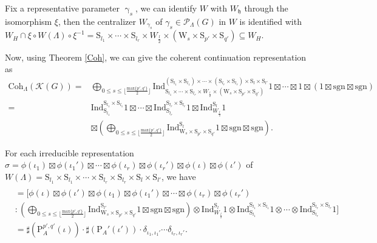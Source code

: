 \documentclass[12pt, a4paper]{amsart}
\numberwithin{equation}{section}
\newcommand{\CK}{{\mathcal {K}}}
\newcommand{\CP}{{\mathcal {P}}}
\newcommand{\fh}{\mathfrak{h}}
\newcommand{\Ind}{{\mathrm{Ind}}}
\newcommand{\sgn}{{\mathrm{sgn}}}
\begin{document}
Fix a representative parameter $\upgamma_s$, we can identify $W$ with $W_{\fh}$ through the isomorphism $\xi$, then the centralizer $W_{{\gamma_{s}}}$ of ${\gamma_{s}} \in \CP_{\Lambda}(G)$ in $W$ is identified with $W_{H} \cap \xi \circ W(\Lambda) \circ \xi^{-1} = \mathrm{S}_{l_1} \times \cdots \times \mathrm{S}_{l_r} \times W_{\frac{l}{2}} \times (\mathrm{W}_{s} \times \mathrm{S}_{p'} \times \mathrm{S}_{q'}) \subseteq W_{H}$.

Now, using Theorem \ref{Coh}, we can give the coherent continuation representation as
\begin{align*}
    \mathrm{Coh}_{\Lambda}(\CK(G))  = &\bigoplus_{0 \leq s \leq \lfloor\frac{\mathrm{max}\{p',q'\}}{2}\rfloor} \Ind _{\mathrm{S}_{l_1} \times \cdots \times \mathrm{S}_{l_r} \times W_{\frac{l}{2}} \times (\mathrm{W}_{s} \times \mathrm{S}_{p'} \times \mathrm{S}_{q'})}^{(\mathrm{S}_{l_1} \times \mathrm{S}_{l_1}) \times \cdots \times (\mathrm{S}_{l_r} \times \mathrm{S}_{l_r}) \times \mathrm{S}_{l} \times \mathrm{S}_{l'}} 1 \boxtimes \cdots \boxtimes 1 \boxtimes (1 \boxtimes \sgn \boxtimes \sgn) \\
    = &\Ind_{\mathrm{S}_{l_1}}^{\mathrm{S}_{l_1}\times \mathrm{S}_{l_1}}1 \boxtimes \cdots \boxtimes \Ind_{\mathrm{S}_{l_r}}^{\mathrm{S}_{l_r}\times \mathrm{S}_{l_r}}1 \boxtimes \Ind_{W_{\frac{l}{2}}}^{\mathrm{S}_{l}} 1\\
    & \boxtimes (\bigoplus_{0 \leq s \leq \lfloor\frac{\mathrm{max}\{p',q'\}}{2}\rfloor}\Ind _{\mathrm{W}_{s} \times \mathrm{S}_{p'} \times \mathrm{S}_{q'}}^{\mathrm{S}_{l}}1 \boxtimes \sgn \boxtimes \sgn ).
\end{align*}

For each irreducible representation $\sigma =  \phi(\iota_1) \boxtimes \phi(\iota_1') \boxtimes \cdots \boxtimes \phi(\iota_r) \boxtimes \phi(\iota_r')\boxtimes \phi(\iota) \boxtimes \phi(\iota')$ of $W(\Lambda) = \mathrm{S}_{l_1} \times \mathrm{S}_{l_1} \times \cdots \times \mathrm{S}_{l_r} \times \mathrm{S}_{l_r} \times \mathrm{S}_{l} \times \mathrm{S}_{l'}$, we have
\begin{align*}
    [\sigma: &\mathrm{Coh}_{\Lambda}(\CK(G))]\\
    &= [\phi(\iota) \boxtimes \phi(\iota') \boxtimes \phi(\iota_1) \boxtimes \phi(\iota_1') \boxtimes \cdots \boxtimes \phi(\iota_r) \boxtimes \phi(\iota_r')\\
    &:(\bigoplus_{0 \leq s \leq \lfloor\frac{\mathrm{max}\{p',q'\}}{2}\rfloor}\Ind _{\mathrm{W}_{s} \times \mathrm{S}_{p'} \times \mathrm{S}_{q'}}^{\mathrm{S}_{l'}}1 \boxtimes \sgn \boxtimes \sgn ) \otimes \Ind_{W_{\frac{l}{2}}}^{\mathrm{S}_{l}} 1 \otimes \Ind_{\mathrm{S}_{l_1}}^{\mathrm{S}_{l_1}\times \mathrm{S}_{l_1}}1 \otimes \cdots \otimes \Ind_{\mathrm{S}_{l_r}}^{\mathrm{S}_{l_r}\times \mathrm{S}_{l_r}}1]\\
    & = \sharp(\mathrm{P}^{p',q'}_A(\iota))\cdot \sharp(\mathrm{P}_{A}'(\iota'))\cdot \delta_{\iota_1,\iota_1'} \cdots \delta_{\iota_r,\iota_r'}. 
\end{align*}
\end{document}
